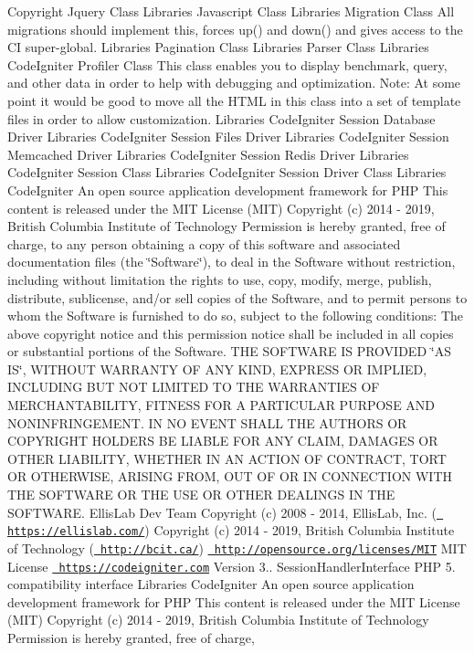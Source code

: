 \begin{DoxyCopyright}{Copyright}
Jquery Class  Libraries Javascript Class  Libraries Migration Class All migrations should implement this, forces up() and down() and gives access to the CI super-\/global.  Libraries Pagination Class  Libraries Parser Class  Libraries Code\+Igniter Profiler Class This class enables you to display benchmark, query, and other data in order to help with debugging and optimization. Note\+: At some point it would be good to move all the H\+T\+ML in this class into a set of template files in order to allow customization.  Libraries Code\+Igniter Session Database Driver  Libraries Code\+Igniter Session Files Driver  Libraries Code\+Igniter Session Memcached Driver  Libraries Code\+Igniter Session Redis Driver  Libraries Code\+Igniter Session Class  Libraries Code\+Igniter Session Driver Class  Libraries Code\+Igniter An open source application development framework for P\+HP This content is released under the M\+IT License (M\+IT) Copyright (c) 2014 -\/ 2019, British Columbia Institute of Technology Permission is hereby granted, free of charge, to any person obtaining a copy of this software and associated documentation files (the \char`\"{}\+Software\char`\"{}), to deal in the Software without restriction, including without limitation the rights to use, copy, modify, merge, publish, distribute, sublicense, and/or sell copies of the Software, and to permit persons to whom the Software is furnished to do so, subject to the following conditions\+: The above copyright notice and this permission notice shall be included in all copies or substantial portions of the Software. T\+HE S\+O\+F\+T\+W\+A\+RE IS P\+R\+O\+V\+I\+D\+ED \char`\"{}\+A\+S I\+S\char`\"{}, W\+I\+T\+H\+O\+UT W\+A\+R\+R\+A\+N\+TY OF A\+NY K\+I\+ND, E\+X\+P\+R\+E\+SS OR I\+M\+P\+L\+I\+ED, I\+N\+C\+L\+U\+D\+I\+NG B\+UT N\+OT L\+I\+M\+I\+T\+ED TO T\+HE W\+A\+R\+R\+A\+N\+T\+I\+ES OF M\+E\+R\+C\+H\+A\+N\+T\+A\+B\+I\+L\+I\+TY, F\+I\+T\+N\+E\+SS F\+OR A P\+A\+R\+T\+I\+C\+U\+L\+AR P\+U\+R\+P\+O\+SE A\+ND N\+O\+N\+I\+N\+F\+R\+I\+N\+G\+E\+M\+E\+NT. IN NO E\+V\+E\+NT S\+H\+A\+LL T\+HE A\+U\+T\+H\+O\+RS OR C\+O\+P\+Y\+R\+I\+G\+HT H\+O\+L\+D\+E\+RS BE L\+I\+A\+B\+LE F\+OR A\+NY C\+L\+A\+IM, D\+A\+M\+A\+G\+ES OR O\+T\+H\+ER L\+I\+A\+B\+I\+L\+I\+TY, W\+H\+E\+T\+H\+ER IN AN A\+C\+T\+I\+ON OF C\+O\+N\+T\+R\+A\+CT, T\+O\+RT OR O\+T\+H\+E\+R\+W\+I\+SE, A\+R\+I\+S\+I\+NG F\+R\+OM, O\+UT OF OR IN C\+O\+N\+N\+E\+C\+T\+I\+ON W\+I\+TH T\+HE S\+O\+F\+T\+W\+A\+RE OR T\+HE U\+SE OR O\+T\+H\+ER D\+E\+A\+L\+I\+N\+GS IN T\+HE S\+O\+F\+T\+W\+A\+RE.  Ellis\+Lab Dev Team  Copyright (c) 2008 -\/ 2014, Ellis\+Lab, Inc. (\href{https://ellislab.com/}{\texttt{ https\+://ellislab.\+com/}})  Copyright (c) 2014 -\/ 2019, British Columbia Institute of Technology (\href{http://bcit.ca/}{\texttt{ http\+://bcit.\+ca/}})  \href{http://opensource.org/licenses/MIT}{\texttt{ http\+://opensource.\+org/licenses/\+M\+IT}} M\+IT License  \href{https://codeigniter.com}{\texttt{ https\+://codeigniter.\+com}}  Version 3..  Session\+Handler\+Interface P\+HP 5. compatibility interface  Libraries Code\+Igniter An open source application development framework for P\+HP This content is released under the M\+IT License (M\+IT) Copyright (c) 2014 -\/ 2019, British Columbia Institute of Technology Permission is hereby granted, free of charge, 
\end{DoxyCopyright}
